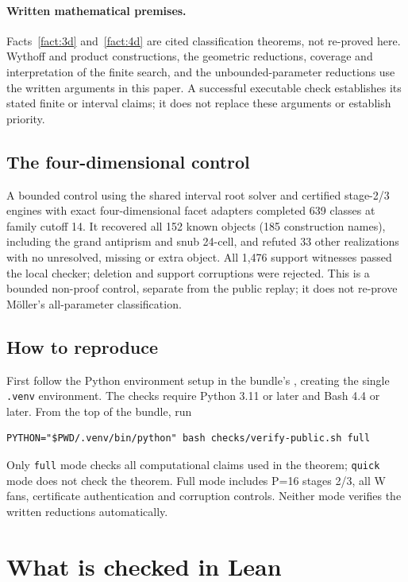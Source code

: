 \documentclass[11pt]{article}
\theoremstyle{definition}
\theoremstyle{remark}
\newcommand{\file}[1]{\path{#1}}
\begin{document}
\paragraph{Written mathematical premises.}
Facts~\ref{fact:3d} and~\ref{fact:4d} are cited classification theorems,
not re-proved here. Wythoff and product constructions, the geometric
reductions, coverage and interpretation of the finite search, and the
unbounded-parameter reductions use the written arguments in this paper.
A successful executable check establishes its stated finite or interval
claims; it does not replace these arguments or establish priority.

\subsection{The four-dimensional control}\label{sec:control}
A bounded control using the shared interval root solver and certified
stage-2/3 engines with exact four-dimensional facet adapters completed
639 classes at family cutoff 14. It recovered all 152 known objects
(185 construction names), including the grand antiprism and snub 24-cell,
and refuted 33 other realizations with no unresolved, missing or extra
object. All 1,476 support witnesses passed the local checker; deletion and
support corruptions were rejected. This is a bounded non-proof control, separate from the public replay;
it does not re-prove Möller's all-parameter classification.

\subsection{How to reproduce}
First follow the Python environment setup in the bundle's
\file{checks/README.md}, creating the single \texttt{.venv} environment. The checks require Python 3.11 or later and Bash 4.4 or later.
From the top of the bundle, run
\begin{verbatim}
PYTHON="$PWD/.venv/bin/python" bash checks/verify-public.sh full
\end{verbatim}
Only \texttt{full} mode checks all computational claims used in the theorem;
\texttt{quick} mode does not check the theorem. Full mode includes P=16
stages 2/3, all W fans, certificate authentication and corruption controls.
Neither mode verifies the written reductions automatically.

\section{What is checked in Lean}\label{sec:lean}
\end{document}

